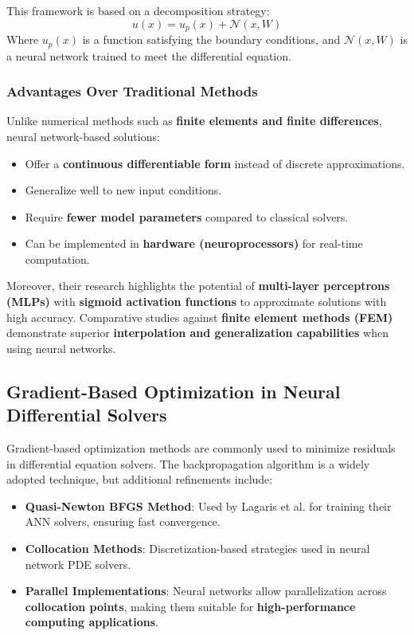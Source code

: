 \documentclass{article}
\begin{document}
This framework is based on a decomposition strategy:
\begin{equation}
    u(x) = u_p(x) + \mathcal{N}(x, W)
\end{equation}
Where \( u_p(x) \) is a function satisfying the boundary conditions, and \( \mathcal{N}(x, W) \) is a neural network trained to meet the differential equation.

\subsubsection{Advantages Over Traditional Methods}
Unlike numerical methods such as \textbf{finite elements and finite differences}, neural network-based solutions:
\begin{itemize}
    \item Offer a \textbf{continuous differentiable form} instead of discrete approximations.
    \item Generalize well to new input conditions.
    \item Require \textbf{fewer model parameters} compared to classical solvers.
    \item Can be implemented in \textbf{hardware (neuroprocessors)} for real-time computation.
\end{itemize}

Moreover, their research highlights the potential of \textbf{multi-layer perceptrons (MLPs)} with \textbf{sigmoid activation functions} to approximate solutions with high accuracy. Comparative studies against \textbf{finite element methods (FEM)} demonstrate superior \textbf{interpolation and generalization capabilities} when using neural networks.

\subsection{Gradient-Based Optimization in Neural Differential Solvers}
Gradient-based optimization methods are commonly used to minimize residuals in differential equation solvers. The backpropagation algorithm is a widely adopted technique, but additional refinements include:
\begin{itemize}
    \item \textbf{Quasi-Newton BFGS Method}: Used by Lagaris et al. \cite{lagaris1998} for training their ANN solvers, ensuring fast convergence.
    \item \textbf{Collocation Methods}: Discretization-based strategies used in neural network PDE solvers.
    \item \textbf{Parallel Implementations}: Neural networks allow parallelization across \textbf{collocation points}, making them suitable for \textbf{high-performance computing applications}.
\end{itemize}
\end{document}
